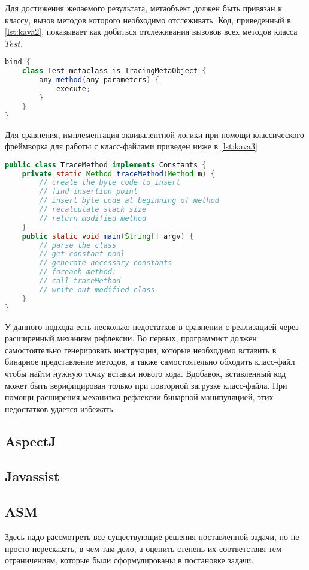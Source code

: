 Для достижения желаемого результата, метаобъект должен быть привязан к классу, вызов методов которого необходимо отслеживать. Код, приведенный в \autoref{lst:kava2}, показывает как добиться отслеживания вызовов всех методов класса $Test$.

\begin{lstlisting}[language=Java, caption=Привязка класса к метаобъекту в $Kava$, label=lst:kava2]
bind {
    class Test metaclass-is TracingMetaObject {
        any-method(any-parameters) {
            execute;
        }
    }
}
\end{lstlisting}

Для сравнения, имплементация эквивалентной логики при помощи классического фреймворка для работы с класс-файлами приведен ниже в \autoref{lst:kava3}

\begin{lstlisting}[language=Java, caption=Реализация аналогичной функциональности при помощи классического фреймворка для работы с класс-файлом, label=lst:kava3]
public class TraceMethod implements Constants {
    private static Method traceMethod(Method m) {
        // create the byte code to insert
        // find insertion point
        // insert byte code at beginning of method
        // recalculate stack size
        // return modified method
    }
    public static void main(String[] argv) {
        // parse the class
        // get constant pool
        // generate necessary constants
        // foreach method:
        // call traceMethod
        // write out modified class
    }
}
\end{lstlisting}

У данного подхода есть несколько недостатков в сравнении с реализацией через расширенный механизм рефлексии. Во первых, программист должен самостоятельно генерировать инструкции, которые необходимо вставить в бинарное представление методов, а также самостоятельно обходить класс-файл чтобы найти нужную точку вставки нового кода. Вдобавок, вставленный код может быть верифицирован только при повторной загрузке класс-файла. При помощи расширения механизма рефлексии бинарной манипуляцией, этих недостатков удается избежать.

\subsection{AspectJ}

\cite{aspectj}

\subsection{Javassist}

\cite{javassist}

\subsection{ASM}

\cite{asm}

Здесь надо рассмотреть все существующие решения поставленной задачи, но не
просто пересказать, в чем там дело, а оценить степень их соответствия тем
ограничениям, которые были сформулированы в постановке задачи.

\newpage
